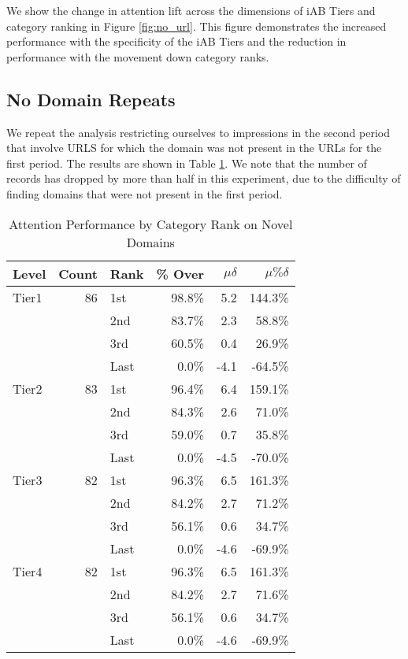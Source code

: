 \documentclass[sigconf]{acmart}
\begin{document}
We show the change in attention lift across the dimensions of iAB Tiers and category ranking
in Figure \ref{fig:no_url}. This figure demonstrates the increased performance with the specificity
of the iAB Tiers and the reduction in performance with the movement down category ranks.

\subsection{No Domain Repeats}
We repeat the analysis restricting ourselves to impressions in the second period
that involve URLS for which the domain was not present in the URLs for the first period.
The results are shown in Table \ref{tab:nodomainrepeats}.
We note that the number of records has dropped by
more than half in this experiment, due to the difficulty of finding domains that were
not present in the first period.

\begin{table}
\caption{Attention Performance by Category Rank on Novel Domains}
\label{tab:nodomainrepeats}
\begin{tabular}{|l|r|l|r|r|r|}
\toprule
Level   &Count  &Rank &\% Over  &$\mu\delta$  &$\mu\%\delta$        \\
\midrule
Tier1   &86       &1st  &98.8\%     &5.2         &144.3\%     \\
        &         &2nd  &83.7\%     &2.3         &58.8\%     \\
        &         &3rd  &60.5\%     &0.4         &26.9\%     \\
        &         &Last &0.0\%      &-4.1        &-64.5\%     \\
Tier2   &83       &1st  &96.4\%     &6.4         &159.1\%     \\
        &         &2nd  &84.3\%     &2.6         &71.0\%     \\
        &         &3rd  &59.0\%     &0.7         &35.8\%     \\
        &         &Last &0.0\%      &-4.5        &-70.0\%     \\
Tier3   &82       &1st  &96.3\%     &6.5         &161.3\%     \\
        &         &2nd  &84.2\%     &2.7         &71.2\%     \\
        &         &3rd  &56.1\%     &0.6         &34.7\%     \\
        &         &Last &0.0\%      &-4.6        &-69.9\%     \\
Tier4   &82       &1st  &96.3\%     &6.5         &161.3\%     \\
        &         &2nd  &84.2\%     &2.7         &71.6\%     \\
        &         &3rd  &56.1\%     &0.6         &34.7\%     \\
        &         &Last &0.0\%      &-4.6        &-69.9\%     \\
\bottomrule
\end{tabular}
\end{table}
\end{document}
